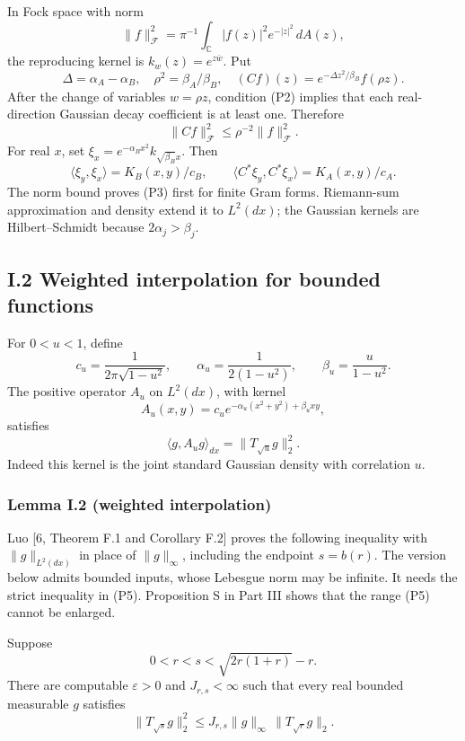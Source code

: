 \documentclass[
  british,
  10pt,
]{article}
\begin{document}
In Fock space with norm \[
\|f\|_{\mathcal F}^2=\pi^{-1}\int_{\mathbb C}|f(z)|^2e^{-|z|^2}\,dA(z),
\] the reproducing kernel is \(k_w(z)=e^{z\overline w}\). Put \[
\Delta=\alpha_A-\alpha_B,\quad \rho^2=\beta_A/\beta_B,\quad
(Cf)(z)=e^{-\Delta z^2/\beta_B}f(\rho z).
\] After the change of variables \(w=\rho z\), condition (P2) implies
that each real-direction Gaussian decay coefficient is at least one.
Therefore \[
\|Cf\|_{\mathcal F}^2\le\rho^{-2}\|f\|_{\mathcal F}^2.
\] For real \(x\), set \(\xi_x=e^{-\alpha_Bx^2}k_{\sqrt{\beta_B}x}\).
Then \[
\langle\xi_y,\xi_x\rangle=K_B(x,y)/c_B,\qquad
\langle C^*\xi_y,C^*\xi_x\rangle=K_A(x,y)/c_A.
\] The norm bound proves (P3) first for finite Gram forms. Riemann-sum
approximation and density extend it to \(L^2(dx)\); the Gaussian kernels
are Hilbert--Schmidt because \(2\alpha_j>\beta_j\).

\subsection{I.2 Weighted interpolation for bounded
functions}\label{i.2-weighted-interpolation-for-bounded-functions}

For \(0<u<1\), define \[
c_u=\frac1{2\pi\sqrt{1-u^2}},\qquad
\alpha_u=\frac1{2(1-u^2)},\qquad
\beta_u=\frac{u}{1-u^2}.
\] The positive operator \(A_u\) on \(L^2(dx)\), with kernel \[
A_u(x,y)=c_u e^{-\alpha_u(x^2+y^2)+\beta_uxy},
\] satisfies \[
\langle g,A_ug\rangle_{dx}=\|T_{\sqrt u}g\|_2^2.          \tag{P4}
\] Indeed this kernel is the joint standard Gaussian density with
correlation \(u\).

\subsubsection{Lemma I.2 (weighted
interpolation)}\label{lemma-i.2-weighted-interpolation}

Luo {[}6, Theorem F.1 and Corollary F.2{]} proves the following
inequality with \(\|g\|_{L^2(dx)}\) in place of \(\|g\|_\infty\),
including the endpoint \(s=b(r)\). The version below admits bounded
inputs, whose Lebesgue norm may be infinite. It needs the strict
inequality in (P5). Proposition S in Part III shows that the range (P5)
cannot be enlarged.

Suppose \[
0<r<s<\sqrt{2r(1+r)}-r.                                \tag{P5}
\] There are computable \(\varepsilon>0\) and \(J_{r,s}<\infty\) such
that every real bounded measurable \(g\) satisfies \[
\boxed{\quad
\|T_{\sqrt s}g\|_2^2
\le J_{r,s}\|g\|_\infty\,\|T_{\sqrt r}g\|_2.
\quad}                                                   \tag{P6}
\]
\end{document}
